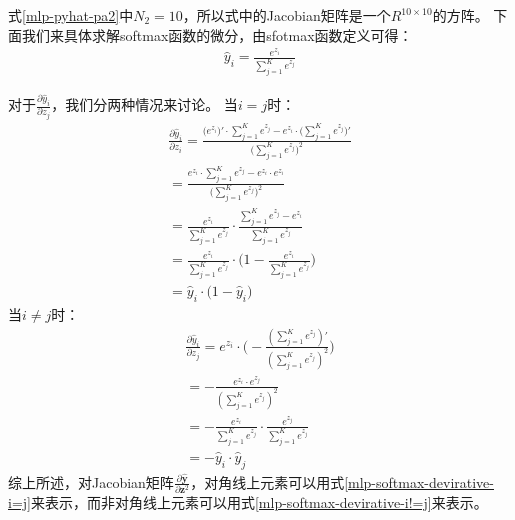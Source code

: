 \documentclass[UTF8]{article}
\begin{document}
式\ref{mlp-pyhat-pa2}中$N_2=10$，所以式中的Jacobian矩阵是一个$R^{10 \times 10}$的方阵。\newline
下面我们来具体求解softmax函数的微分，由sfotmax函数定义可得：
\begin{equation}
\begin{aligned}
\hat{y}_i=\frac{e^{z_i}}{\sum_{j=1}^{K}e^{z_j}}
\end{aligned}
\label{mlp-softmax-def-for-i-element}
\end{equation}

对于$\frac{\partial{\hat{y}_i}}{\partial{z_j}}$，我们分两种情况来讨论。\newline
当$i=j$时：
\begin{equation}
\begin{aligned}
\frac{\partial{\hat{y}_i}}{\partial{z_i}}=\frac{\big( e^{z_i} \big)' \cdot \sum_{j=1}^{K}e^{z_j} - e^{z_i} \cdot \big( \sum_{j=1}^{K}e^{z_j} \big)'}{\big( \sum_{j=1}^{K}e^{z_j} \big)^2}\\
=\frac{e^{z_i} \cdot \sum_{j=1}^{K}e^{z_j} - e^{z_i} \cdot e^{z_i}}{\big( \sum_{j=1}^{K}e^{z_j} \big)^2}\\
=\frac{e^{z_i}}{\sum_{j=1}^{K}e^{z_j}} \cdot \frac{\sum_{j=1}^{K}e^{z_j} - e^{z_i}}{\sum_{j=1}^{K}e^{z_j}}\\
=\frac{e^{z_i}}{\sum_{j=1}^{K}e^{z_j}} \cdot \bigg( 1-\frac{e^{z_i}}{\sum_{j=1}^{K}e^{z_j}} \bigg)\\
=\hat{y}_i \cdot \big( 1 - \hat{y}_i \big)
\end{aligned}
\label{mlp-softmax-devirative-i=j}
\end{equation}
当$i \ne j$时：
\begin{equation}
\begin{aligned}
\frac{\partial{\hat{y}_i}}{\partial{z_j}}=e^{z_i} \cdot \bigg( -\frac{(\sum_{j=1}^{K}e^{z_j})'}{(\sum_{j=1}^{K}e^{z_j})^2} \bigg)\\
=-\frac{e^{z_i} \cdot e^{z_j}}{(\sum_{j=1}^{K}e^{z_j})^2}\\
=-\frac{e^{z_i}}{\sum_{j=1}^{K}e^{z_j}} \cdot \frac{e^{z_j}}{\sum_{j=1}^{K}e^{z_j}}\\
=-\hat{y}_i \cdot \hat{y}_j
\end{aligned}
\label{mlp-softmax-devirative-i!=j}
\end{equation}
综上所述，对Jacobian矩阵$\frac{\partial{\hat{\boldsymbol{y}}}}{\partial{\boldsymbol{z}^2}}$，对角线上元素可以用式\ref{mlp-softmax-devirative-i=j}来表示，而非对角线上元素可以用式\ref{mlp-softmax-devirative-i!=j}来表示。
\end{document}
